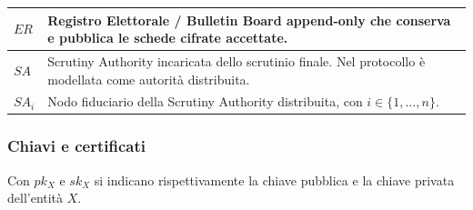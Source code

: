 \documentclass[a4paper,12pt]{article}
\begin{document}
\begin{longtable}{|>{\raggedright\arraybackslash}p{}|>{\raggedright\arraybackslash}p{}|}
	\hline
	$ER$                                  & Registro Elettorale / Bulletin Board append-only che conserva e pubblica le schede cifrate accettate.                                                                \\
	\hline
	$SA$                                  & Scrutiny Authority incaricata dello scrutinio finale. Nel protocollo è modellata come autorità distribuita.                                                          \\
	\hline
	$SA_i$                                & Nodo fiduciario della Scrutiny Authority distribuita, con $i \in \{1,\dots,n\}$.                                                                                     \\
	\hline
\end{longtable}

\subsubsection{Chiavi e certificati}

Con $pk_X$ e $sk_X$ si indicano rispettivamente la chiave pubblica e la chiave privata dell'entità $X$.
\end{document}
